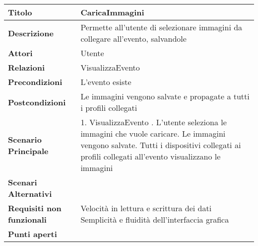 \begin{tabular} {|P{4.5cm}|P{11cm}|}
  \hline
  \textbf{Titolo}                   & CaricaImmagini                                                                  \\
  \hline
  \textbf{Descrizione}              & Permette all'utente di selezionare immagini da collegare all'evento, salvandole \\
  \hline
  \textbf{Attori}                   & Utente                                                                          \\
  \hline
  \textbf{Relazioni}                & VisualizzaEvento                                                                \\
  \hline
  \textbf{Precondizioni}            & L'evento esiste                                                                 \\
  \hline
  \textbf{Postcondizioni}           & Le immagini vengono salvate e propagate a tutti i profili collegati             \\
  \hline
  \textbf{Scenario Principale}      & 1. VisualizzaEvento . L'utente seleziona le immagini che vuole caricare. Le immagini vengono salvate. Tutti i dispositivi collegati ai profili collegati all'evento visualizzano le immagini                           \\
  \hline
  \textbf{Scenari Alternativi}      &                                                                                 \\
  \hline
  \textbf{Requisiti non funzionali} & Velocità in lettura e scrittura dei dati\linebreak
  Semplicità e fluidità dell'interfaccia grafica                                                                      \\
  \hline
  \textbf{Punti aperti}             &                                                                                 \\
  \hline
\end{tabular}
\hfill
\break

